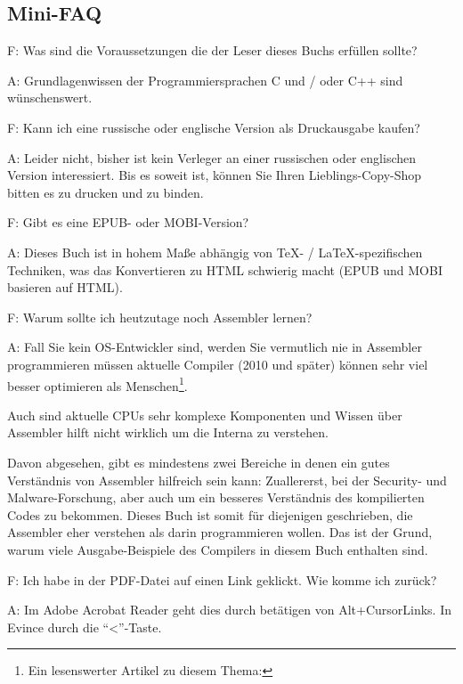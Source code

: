 \subsection*{Mini-FAQ}

\par F: Was sind die Voraussetzungen die der Leser dieses Buchs erfüllen sollte?
\par A: Grundlagenwissen der Programmiersprachen C und / oder C++ sind wünschenswert.

\par F: Kann ich eine russische oder englische Version als Druckausgabe kaufen?
\par A: Leider nicht, bisher ist kein Verleger an einer russischen oder englischen Version interessiert.
Bis es soweit ist, können Sie Ihren Lieblings-Copy-Shop bitten es zu drucken und zu binden.

\par F: Gibt es eine EPUB- oder MOBI-Version?
\par A: Dieses Buch ist in hohem Maße abhängig von \TeX{}- / \LaTeX{}-spezifischen Techniken,
was das Konvertieren zu HTML schwierig macht (EPUB und MOBI basieren auf HTML).

\par F: Warum sollte ich heutzutage noch Assembler lernen?
\par A: Fall Sie kein \ac{OS}-Entwickler sind, werden Sie vermutlich nie in Assembler programmieren müssen \textemdash{}
aktuelle Compiler (2010 und später) können sehr viel besser optimieren als Menschen\footnote{Ein lesenswerter Artikel zu diesem Thema: \InSqBrackets{\AgnerFog}}.

Auch sind aktuelle \ac{CPU}s sehr komplexe Komponenten und Wissen über Assembler hilft nicht wirklich
um die Interna zu verstehen.

Davon abgesehen, gibt es mindestens zwei Bereiche in denen ein gutes Verständnis von Assembler hilfreich
sein kann: Zuallererst, bei der Security- und Malware-Forschung, aber auch um ein besseres Verständnis des kompilierten
Codes zu bekommen.
Dieses Buch ist somit für diejenigen geschrieben, die Assembler eher verstehen als darin programmieren wollen.
Das ist der Grund, warum viele Ausgabe-Beispiele des Compilers in diesem Buch enthalten sind.

\par F: Ich habe in der PDF-Datei auf einen Link geklickt. Wie komme ich zurück?
\par A: Im Adobe Acrobat Reader geht dies durch betätigen von Alt+CursorLinks.
In Evince durch die ``<''-Taste.

